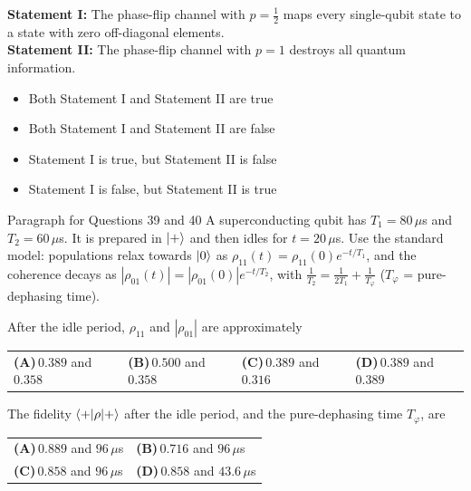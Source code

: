 \documentclass[11pt,a4paper]{article}
\newcommand{\optlabel}[1]{\textbf{(#1)}}
\newenvironment{qitem}[1]{\begin{list}{}{\setlength{\leftmargin}{3.3em}\setlength{\labelwidth}{3.1em}%
  \setlength{\labelsep}{0.2em}\setlength{\topsep}{3pt}\setlength{\parsep}{3pt}}\item[\textbf{Q.#1}\hfill]}{\end{list}}
\newcommand{\qsep}{\par\vspace{2pt}{\color{black!15}\hrule}\vspace{4pt}}
\begin{document}
\begin{qitem}{38}
\textbf{Statement I:} The phase-flip channel with $p = \frac12$ maps every single-qubit state to a state with zero off-diagonal elements.\\[1mm]
\textbf{Statement II:} The phase-flip channel with $p = 1$ destroys all quantum information.
\begin{itemize}[leftmargin=2.6em, labelsep=0.4em, itemsep=2pt, topsep=3pt]
\item[\optlabel{A}] Both Statement I and Statement II are true
\item[\optlabel{B}] Both Statement I and Statement II are false
\item[\optlabel{C}] Statement I is true, but Statement II is false
\item[\optlabel{D}] Statement I is false, but Statement II is true
\end{itemize}
\end{qitem}
\qsep

\begin{passagebox}{Paragraph for Questions 39 and 40}
A superconducting qubit has $T_1 = 80\,\mu$s and $T_2 = 60\,\mu$s. It is prepared in $\ket+$ and then idles for $t = 20\,\mu$s.
Use the standard model: populations relax towards $\ket0$ as $\rho_{11}(t) = \rho_{11}(0)e^{-t/T_1}$, and the coherence decays as
$|\rho_{01}(t)| = |\rho_{01}(0)|e^{-t/T_2}$, with $\frac{1}{T_2} = \frac{1}{2T_1} + \frac{1}{T_\varphi}$ ($T_\varphi$ = pure-dephasing time).
\end{passagebox}
\begin{qitem}{39}
After the idle period, $\rho_{11}$ and $|\rho_{01}|$ are approximately
\par\smallskip\noindent\begin{tabularx}{\linewidth}{@{}*{4}{L}@{}}
\optlabel{A}\,$0.389$ and $0.358$ & \optlabel{B}\,$0.500$ and $0.358$ & \optlabel{C}\,$0.389$ and $0.316$ & \optlabel{D}\,$0.389$ and $0.389$
\end{tabularx}
\end{qitem}
\qsep

\begin{qitem}{40}
The fidelity $\braket{+|\rho|+}$ after the idle period, and the pure-dephasing time $T_\varphi$, are
\par\smallskip\noindent\begin{tabularx}{\linewidth}{@{}*{2}{L}@{}}
\optlabel{A}\,$0.889$ and $96\,\mu$s & \optlabel{B}\,$0.716$ and $96\,\mu$s \\[3pt]
\optlabel{C}\,$0.858$ and $96\,\mu$s & \optlabel{D}\,$0.858$ and $43.6\,\mu$s
\end{tabularx}
\end{qitem}
\qsep
\end{document}
